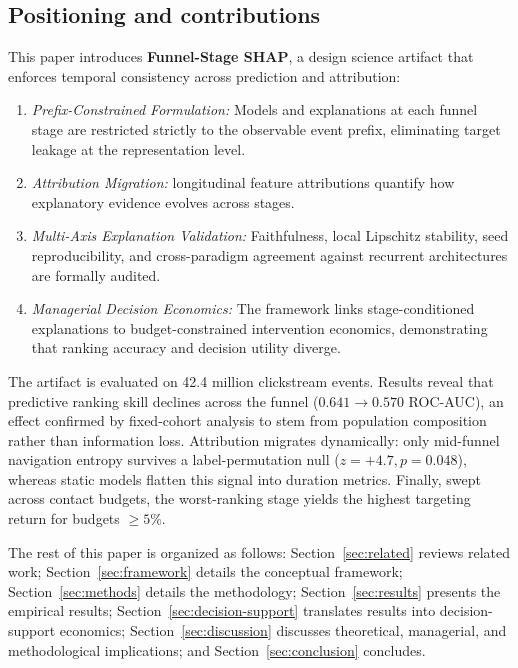\documentclass[a4paper]{article}
\begin{document}
\subsection{Positioning and contributions}
\label{sec:positioning}

This paper introduces \textbf{Funnel-Stage SHAP}, a design science artifact
\citep{hevner2004design} that enforces temporal consistency across prediction and
attribution:
\begin{enumerate}
\itemsep0em
\item \emph{Prefix-Constrained Formulation:} Models and explanations at each funnel
stage are restricted strictly to the observable event prefix, eliminating target
leakage at the representation level.
\item \emph{Attribution Migration:} longitudinal feature attributions quantify how
explanatory evidence evolves across stages.
\item \emph{Multi-Axis Explanation Validation:} Faithfulness, local Lipschitz
stability, seed reproducibility, and cross-paradigm agreement against recurrent
architectures \citep{bento2021timeshap, nayebi2023windowshap} are formally audited.
\item \emph{Managerial Decision Economics:} The framework links stage-conditioned
explanations to budget-constrained intervention economics, demonstrating that
ranking accuracy and decision utility diverge.
\end{enumerate}

The artifact is evaluated on 42.4 million clickstream events. Results reveal that
predictive ranking skill declines across the funnel ($0.641 \to 0.570$ ROC-AUC), an
effect confirmed by fixed-cohort analysis to stem from population composition rather
than information loss. Attribution migrates dynamically: only mid-funnel navigation
entropy survives a label-permutation null ($z = +4.7, p = 0.048$), whereas static
models flatten this signal into duration metrics. Finally, swept across contact
budgets, the worst-ranking stage yields the highest targeting return for budgets
$\ge 5\%$.

The rest of this paper is organized as follows: Section~\ref{sec:related} reviews
related work; Section~\ref{sec:framework} details the conceptual framework;
Section~\ref{sec:methods} details the methodology; Section~\ref{sec:results} presents
the empirical results; Section~\ref{sec:decision-support} translates results into
decision-support economics; Section~\ref{sec:discussion} discusses theoretical,
managerial, and methodological implications; and Section~\ref{sec:conclusion} concludes.
\end{document}
